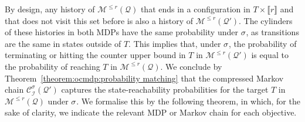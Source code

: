 \documentclass[a4paper,UKenglish,cleveref,autoref,thm-restate,colorlinks]{lipics-v2021}
\newcommand{\integerInterval}[1]{\llbracket{}#1\rrbracket{}}
\newcommand{\mdp}{\mathcal{M}}
\newcommand{\ocmdp}{\mathcal{Q}}
\newcommand{\ocmdpFin}[2]{\mdp^{\leq #2}(#1)}
\newcommand{\counterUB}{r}
\newcommand{\mchain}{\mathcal{C}}
\newcommand{\intPart}{\mathcal{I}}
\newcommand{\compressChainB}{\mchain^{\strat}_{\intPart}({\ocmdp'})}
\newcommand{\target}{T}
\newcommand{\stratGeneric}[1]{{\sigma_{#1}}}
\newcommand{\strat}{\stratGeneric{}}
\begin{document}
By design, any history of $\ocmdpFin{\ocmdp}{\counterUB}$ that ends in a configuration in $\target\times\integerInterval{\counterUB}$ and that does not visit this set before is also a history of $\ocmdpFin{\ocmdp'}{\counterUB}$.
The cylinders of these histories in both MDPs have the same probability under $\strat$, as transitions are the same in states outside of $\target$.
This implies that, under $\strat$, the probability of terminating or hitting the counter upper bound in $\target$ in $\ocmdpFin{\ocmdp'}{\counterUB}$ is equal to the probability of reaching $\target$ in $\ocmdpFin{\ocmdp}{\counterUB}$.
We conclude by Theorem~\ref{theorem:ocmdp:probability matching} that the compressed Markov chain $\compressChainB$ captures the state-reachability probabilities for the target $\target$ in $\ocmdpFin{\ocmdp}{\counterUB}$ under $\strat$.
We formalise this by the following theorem, in which, for the sake of clarity, we indicate the relevant MDP or Markov chain for each objective.
\end{document}

